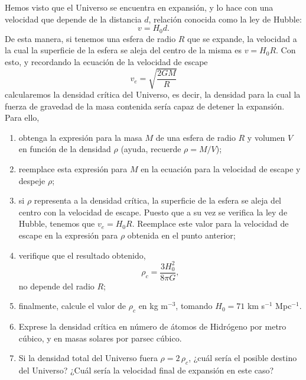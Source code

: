 \documentclass[a4paper,12pt]{article}
\begin{document}
\begin{enumerate}
Hemos visto que el Universo se encuentra en expansión, y lo hace con una
velocidad que depende de la distancia $d$, relación conocida como la ley de
Hubble:
\[v = H_0 d.\]
De esta manera, si tenemos una esfera de radio $R$ que se expande, la velocidad
a la cual la superficie de la esfera se aleja del centro de la misma es $v =
H_0 R$.
Con esto, y recordando la ecuación de la velocidad de escape
\[v_e = \sqrt{\frac{2 G M}{R}} \]
calcularemos la densidad crítica del Universo, es decir, la densidad para la
cual la fuerza de gravedad de la masa contenida sería capaz de detener la
expansión. Para ello,
\begin{enumerate}
\item obtenga la expresión para la masa $M$ de una esfera de radio $R$ y
volumen $V$ en función de la densidad $\rho$ (ayuda, recuerde $\rho=M/V$);
\item reemplace esta expresión para $M$ en la ecuación para la velocidad de
escape y despeje $\rho$;
\item si $\rho$ representa a la densidad crítica, la superficie de la esfera se
aleja del centro con la velocidad de escape. Puesto que a su vez se verifica la
ley de Hubble, tenemos que $v_e = H_0 R$. Reemplace este valor para la velocidad
de escape en la expresión para $\rho$ obtenida en el punto anterior;
\item verifique que el resultado obtenido, 
\[\rho_c = \frac{3 H_0^2}{8 \pi G}, \]
no depende del radio $R$;
\item finalmente, calcule el valor de $\rho_c$ en kg m$^{-3}$, tomando $H_0=71$
km s$^{-1}$ Mpc$^{-1}$. 
\item Exprese la densidad crítica en número de átomos de Hidrógeno por metro
cúbico, y en masas solares por parsec cúbico.
\item Si la densidad total del Universo fuera $\rho=2\,\rho_c$, ¿cuál sería el
posible destino del Universo? ¿Cuál sería la velocidad final de expansión en
este caso? 
\end{enumerate}

\end{enumerate}
\end{document}
